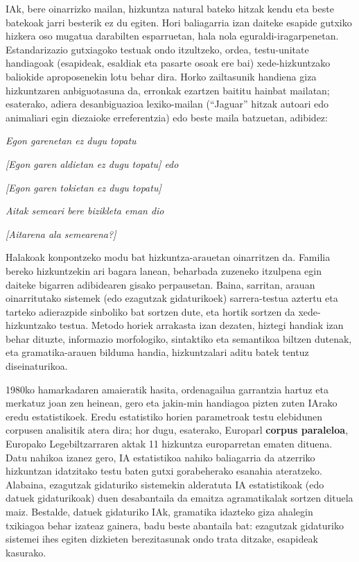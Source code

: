 \begin{multicols}{2}
IAk, bere oinarrizko mailan, hizkuntza natural bateko hitzak kendu eta beste batekoak jarri besterik ez du egiten. Hori baliagarria izan daiteke esapide gutxiko hizkera oso mugatua darabilten esparruetan, hala nola eguraldi-iragarpenetan. Estandarizazio gutxiagoko testuak ondo itzultzeko, ordea, testu-unitate handiagoak (esapideak, esaldiak eta pasarte osoak ere bai) xede-hizkuntzako baliokide aproposenekin lotu behar dira. Horko zailtasunik handiena giza hizkuntzaren anbiguotasuna da, erronkak ezartzen baititu hainbat mailatan; esaterako, adiera desanbiguazioa lexiko-mailan (“Jaguar” hitzak autoari edo animaliari egin diezaioke erreferentzia) edo beste maila batzuetan, adibidez:

\textit{Egon garenetan ez dugu topatu}

\textit{[Egon garen aldietan ez dugu topatu] edo} 

\textit{[Egon garen tokietan ez dugu topatu]}

\textit{Aitak semeari bere bizikleta eman dio}

\textit{[Aitarena ala semearena?]}

Halakoak konpontzeko modu bat hizkuntza-arauetan oinarritzen da. Familia bereko hizkuntzekin ari bagara lanean, beharbada zuzeneko itzulpena egin daiteke bigarren adibidearen gisako perpausetan. Baina, sarritan, arauan oinarritutako sistemek (edo ezagutzak gidaturikoek) sarrera-testua aztertu eta tarteko adierazpide sinboliko bat sortzen dute, eta hortik sortzen da xede-hizkuntzako testua. Metodo horiek arrakasta izan dezaten, hiztegi handiak izan behar dituzte, informazio morfologiko, sintaktiko eta semantikoa biltzen dutenak, eta gramatika-arauen bilduma handia, hizkuntzalari aditu batek tentuz diseinaturikoa.

1980ko hamarkadaren amaieratik hasita, ordenagailua garrantzia hartuz eta merkatuz joan zen heinean, gero eta jakin-min handiagoa pizten zuten IArako eredu estatistikoek. Eredu estatistiko horien parametroak testu elebidunen corpusen analisitik atera dira; hor dugu, esaterako, Europarl \textbf{corpus paraleloa}, Europako Legebiltzarraren aktak 11 hizkuntza europarretan ematen dituena. Datu nahikoa izanez gero, IA estatistikoa nahiko baliagarria da atzerriko hizkuntzan idatzitako testu baten gutxi gorabeherako esanahia ateratzeko. Alabaina, ezagutzak gidaturiko sistemekin alderatuta IA estatistikoak (edo datuek gidaturikoak) duen desabantaila da emaitza agramatikalak sortzen dituela maiz. Bestalde, datuek gidaturiko IAk, gramatika idazteko giza ahalegin txikiagoa behar izateaz gainera, badu beste abantaila bat: ezagutzak gidaturiko sistemei ihes egiten dizkieten berezitasunak ondo trata ditzake, esapideak kasurako. 


\end{multicols}
